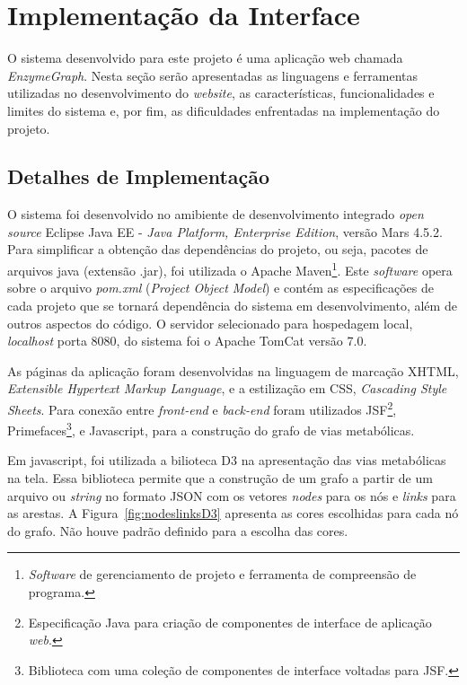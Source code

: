 \section{Implementação da Interface} \label{implementacao}


\indent O sistema desenvolvido para este projeto é uma aplicação web chamada \textit{EnzymeGraph}. Nesta seção serão apresentadas as linguagens e ferramentas utilizadas no desenvolvimento do \textit{website}, as características, funcionalidades e limites do sistema e, por fim, as dificuldades enfrentadas na implementação do projeto.

\subsection{Detalhes de Implementação}

\indent O sistema foi desenvolvido no amibiente de desenvolvimento integrado \textit{open source} Eclipse Java EE - \textit{Java Platform, Enterprise Edition}, versão Mars 4.5.2. Para simplificar a obtenção das dependências do projeto, ou seja, pacotes de arquivos java (extensão .jar), foi utilizada o Apache Maven\footnote{\textit{Software} de gerenciamento de projeto e ferramenta de compreensão de programa.}. Este \textit{software} opera sobre o arquivo \textit{pom.xml} (\textit{Project Object Model}) e contém as especificações de cada projeto que se tornará dependência do sistema em desenvolvimento, além de outros aspectos do código. O servidor selecionado para hospedagem local, \textit{localhost} porta 8080, do sistema foi o Apache TomCat versão 7.0.

\indent As páginas da aplicação foram desenvolvidas na linguagem de marcação XHTML, \textit{Extensible Hypertext Markup Language}, e a estilização em CSS, \textit{Cascading Style Sheets}. Para conexão entre \textit{front-end} e \textit{back-end} foram utilizados JSF\footnote{Especificação Java para criação de componentes de interface de aplicação \textit{web}.}, Primefaces\footnote{Biblioteca com uma coleção de componentes de interface voltadas para JSF.}, e Javascript, para a construção do grafo de vias metabólicas.

\indent Em javascript, foi utilizada a bilioteca D3 na apresentação das vias metabólicas na tela. Essa biblioteca permite que a construção de um grafo a partir de um arquivo ou \textit{string} no formato JSON com os vetores \textit{nodes} para os nós e \textit{links} para as arestas. A Figura~\ref{fig:nodeslinksD3} apresenta as cores escolhidas para cada nó do grafo. Não houve padrão definido para a escolha das cores.

